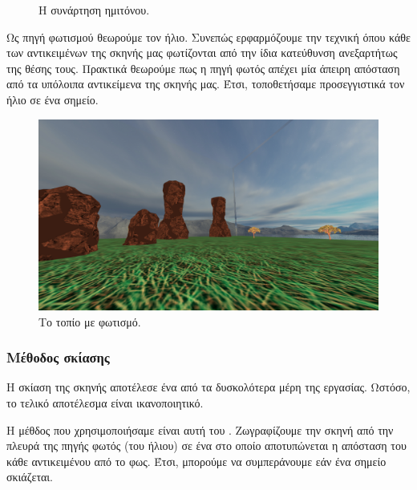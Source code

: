 \documentclass[11pt]{scrartcl} %
\newenvironment{centerimg}[1]%
{%
    \begin{figure}[H]
        #1
    \begin{center}
}%
{%
    \end{center}
    \end{figure}
}
\begin{document}
\begin{figure}[H]
    \begin{center}
        \caption{Η συνάρτηση ημιτόνου.}
        \end{center}
\end{figure}

Ως πηγή φωτισμού θεωρούμε τον ήλιο. Συνεπώς ερφαρμόζουμε την τεχνική  όπου 
κάθε  των αντικειμένων της σκηνής μας φωτίζονται από την ίδια κατεύθυνση ανεξαρτήτως της θέσης τους.
Πρακτικά θεωρούμε πως η πηγή φωτός απέχει μία άπειρη απόσταση από τα υπόλοιπα αντικείμενα της σκηνής μας.
Έτσι, τοποθετήσαμε προσεγγιστικά τον ήλιο σε ένα  σημείο. 

\begin{centerimg}{\caption{Το τοπίο με φωτισμό.}}
    \includegraphics[width=.7\textwidth]{./assets/lighting.png}
\end{centerimg}

\subsubsection{Μέθοδος σκίασης}

Η σκίαση της σκηνής αποτέλεσε ένα από τα δυσκολότερα μέρη της εργασίας. Ωστόσο, το τελικό αποτέλεσμα 
είναι ικανοποιητικό. 

Η μέθδος που χρησιμοποιήσαμε είναι αυτή του . Ζωγραφίζουμε την σκηνή από την πλευρά 
της πηγής φωτός (του ήλιου) σε ένα  στο οποίο αποτυπώνεται η απόσταση του κάθε αντικειμένου 
από το φως. Έτσι, μπορούμε να συμπεράνουμε εάν ένα σημείο σκιάζεται. 
\end{document}
